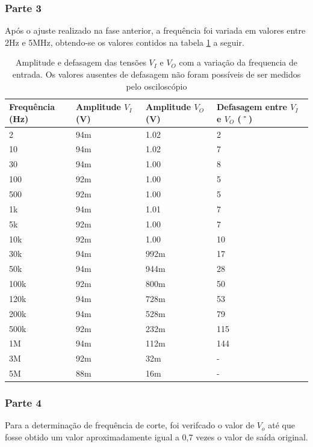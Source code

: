 \documentclass{abntex2}
\begin{document}
\subsubsection{Parte 3}

  Após o ajuste realizado na fase anterior, a frequência foi variada em valores entre 2Hz e 5MHz, obtendo-se os valores contidos na tabela \ref{tab:exp1} a seguir.

  \begin{table}[h!]
  \centering
  \begin{tabular}[width = 0.8\textwidth]{|l|l|l|l|}
    \hline
    Frequência (Hz) & Amplitude $V_I$ (V) & Amplitude $V_O$ (V) & Defasagem entre $V_I$ e $V_O$ (˚) \\
    \hline
    2  & 94m & 1.02 &  2 \\
    \hline
    10   & 94m & 1.02 &  7 \\
    \hline
    30   & 94m & 1.00 &  8 \\
    \hline
    100  & 92m & 1.00 &  5 \\
    \hline
    500  & 92m & 1.00 &  5 \\
    \hline
    1k   & 94m & 1.01 &  7 \\
    \hline
    5k   & 92m & 1.00 &  7 \\
    \hline
    10k  & 92m & 1.00 &  10 \\
    \hline
    30k  & 94m & 992m &  17 \\
    \hline
    50k  & 94m & 944m &  28 \\
    \hline
    100k & 92m & 800m &  50 \\
    \hline
    120k & 94m & 728m &  53 \\
    \hline
    200k & 94m & 528m &  79 \\
    \hline
    500k & 92m & 232m &  115 \\
    \hline
    1M   & 94m & 112m &  144 \\
    \hline
    3M   & 92m & 32m &   - \\
    \hline
    5M   & 88m & 16m &   - \\
    \hline
  \end{tabular}
  \caption{Amplitude e defasagem das tensões $V_I$ e $V_O$ com a variação da frequencia de entrada. Os valores ausentes de defasagem não foram possíveis de ser medidos pelo osciloscópio}
  \label{tab:exp1}
  \end{table}

\subsubsection{Parte 4}
  Para a determinação de frequência de corte, foi verifcado o valor de $V_o$ até que fosse obtido um valor aproximadamente igual a 0,7 vezes o valor de saída original.
\end{document}
